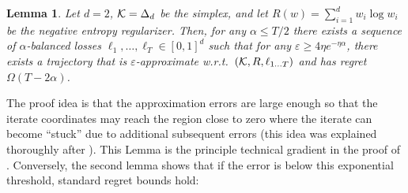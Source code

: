 \documentclass[10pt]{article}
\newtheorem{lemma}[theorem]{Lemma}
\theoremstyle{definition}
\theoremstyle{remark}
\renewcommand{\epsilon}{\varepsilon}
\begin{document}
\begin{lemma} \label{lem:balance lower bound}
Let $d=2$, $\mathcal K=\Delta_d$ be the simplex, and let $R(w)=\sum_{i=1}^d w_i\log w_i$ be the negative entropy regularizer.
Then, for any $\alpha \le T/2$ there exists a sequence of $\alpha$-balanced losses $\ell_1, \ldots, \ell_T \in [0,1]^d$ such that 
for any $\epsilon \ge 4\eta e^{-\eta \alpha}$, 
there exists a trajectory that is $\epsilon$-approximate w.r.t.~$(\mathcal K, R, \ell_{1\dots T})$ and has regret $\Omega(T-2\alpha)$.
\end{lemma}

The proof idea is that the approximation errors are large enough so that the iterate coordinates may reach the region close to zero where the iterate can become ``stuck'' due to additional subsequent errors (this idea was explained thoroughly after ).
This Lemma is the principle technical gradient in the proof of . Conversely, the second lemma shows that if the error is below this exponential threshold, standard regret bounds hold:
\end{document}
